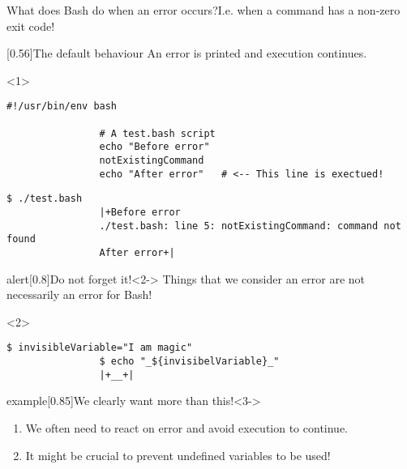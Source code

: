 \begin{frame}[fragile]{What does Bash do when an error occurs?}{I.e. when a command has a non-zero exit code!}
    \vspace{-3mm}
    \begin{overlayarea}{\textwidth}{0.7\textheight}
        \begin{varblock}{}[0.56\textwidth]{The default behaviour}
            An error is printed and \alert{execution continues}.
        \end{varblock}
        \begin{onlyenv}<1>
            \begin{lstlisting}[style=myBash, numberblanklines=true, countblanklines=true, aboveskip=5mm]
                #!/usr/bin/env bash

                # A test.bash script
                echo "Before error"
                notExistingCommand
                echo "After error"   # <-- This line is exectued!
            \end{lstlisting}
            \begin{lstlisting}[style=myBash, numbers=none, aboveskip=2mm]
                $ ./test.bash
                |+Before error
                ./test.bash: line 5: notExistingCommand: command not found
                After error+|
            \end{lstlisting}
        \end{onlyenv}
        \begin{varblock}{alert}[0.8\textwidth]{Do not forget it!}<2->
            Things that we consider an error are not necessarily an error for Bash!
        \end{varblock}
        \begin{onlyenv}<2>
            \begin{lstlisting}[style=myBash, numbers=none, aboveskip=5mm]
                $ invisibleVariable="I am magic"
                $ echo "_${invisibelVariable}_"
                |+__+|
            \end{lstlisting}
        \end{onlyenv}
        \begin{varblock}{example}[0.85\textwidth]{We clearly want more than this!}<3->
            \begin{enumerate}
                \item We often need to react on error and avoid execution to continue.
                \item It might be crucial to prevent undefined variables to be used!

\end{enumerate}
\end{varblock}
\end{overlayarea}
\end{frame}
